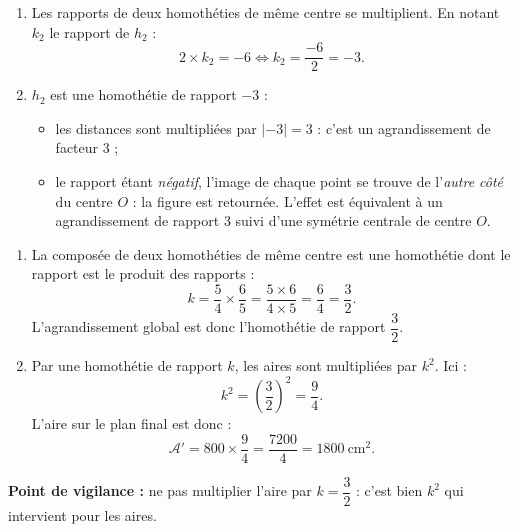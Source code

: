 \documentclass[11pt]{article}
\newcommand{\cle}[1]{{\popxbold\color{popdark}#1}}
\begin{document}
\begin{corrige}
\begin{enumerate}
\item Les rapports de deux homothéties de même centre se multiplient. En notant $k_2$ le rapport de $h_2$ :
\[ 2\times k_2=-6 \iff k_2=\dfrac{-6}{2}=-3. \]
\item $h_2$ est une homothétie de rapport $-3$ :
\begin{itemize}
\item les distances sont multipliées par $|-3|=3$ : c'est un \cle{agrandissement} de facteur $3$ ;
\item le rapport étant \emph{négatif}, l'image de chaque point se trouve de l'\emph{autre côté} du centre $O$ : la figure est retournée. L'effet est équivalent à un agrandissement de rapport $3$ suivi d'une symétrie centrale de centre $O$.
\end{itemize}
\end{enumerate}
\end{corrige}

\begin{corrige}
\begin{enumerate}
\item La composée de deux homothéties de même centre est une homothétie dont le rapport est le produit des rapports :
\[ k=\dfrac{5}{4}\times\dfrac{6}{5}=\dfrac{5\times 6}{4\times 5}=\dfrac{6}{4}=\dfrac{3}{2}. \]
L'agrandissement global est donc l'homothétie de rapport $\dfrac{3}{2}$.
\item Par une homothétie de rapport $k$, les aires sont multipliées par $k^2$. Ici :
\[ k^2=\left(\dfrac{3}{2}\right)^2=\dfrac{9}{4}. \]
L'aire sur le plan final est donc :
\[ \mathcal{A}'=800\times\dfrac{9}{4}=\dfrac{7200}{4}=1800\ \mathrm{cm}^2. \]
\end{enumerate}
\textbf{Point de vigilance :} ne pas multiplier l'aire par $k=\dfrac{3}{2}$ : c'est bien $k^2$ qui intervient pour les aires.
\end{corrige}
\end{document}
